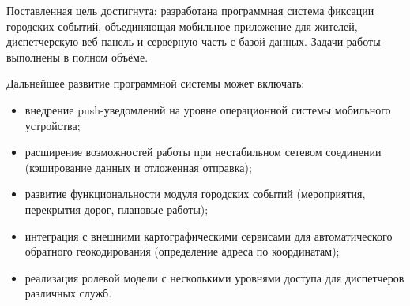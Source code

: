 Поставленная цель достигнута: разработана программная система фиксации городских событий, объединяющая мобильное приложение для жителей, диспетчерскую веб-панель и серверную часть с базой данных. Задачи работы выполнены в полном объёме.

Дальнейшее развитие программной системы может включать:
\begin{itemize}
    \item внедрение push-уведомлений на уровне операционной системы мобильного устройства;
    \item расширение возможностей работы при нестабильном сетевом соединении (кэширование данных и отложенная отправка);
    \item развитие функциональности модуля городских событий (мероприятия, перекрытия дорог, плановые работы);
    \item интеграция с внешними картографическими сервисами для автоматического обратного геокодирования (определение адреса по координатам);
    \item реализация ролевой модели с несколькими уровнями доступа для диспетчеров различных служб.
\end{itemize}
